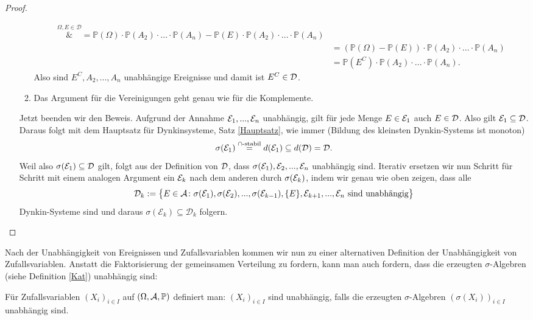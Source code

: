 \begin{proof}
\begin{itemize}
\begin{enumerate}[label=(\roman*)]
\begin{align*}
				\overset{\Omega, E\in \mathcal D}&{=} \mathbb{P}(\Omega) \cdot \mathbb{P}(A_2) \cdot ... \cdot \mathbb{P}(A_n) - \mathbb{P}(E) \cdot \mathbb{P}(A_2) \cdot ... \cdot \mathbb{P}(A_n)\\
				&= (\mathbb{P}(\Omega) - \mathbb{P}(E)) \cdot \mathbb{P}(A_2) \cdot ... \cdot \mathbb{P}(A_n)\\
				&= \mathbb{P}(E^C) \cdot \mathbb{P}(A_2) \cdot ... \cdot \mathbb{P}(A_n).
			\end{align*}
			Also sind $E^C, A_2, ...,A_n$ unabh\"angige Ereignisse und damit ist $E^C\in \mathcal{D}$.
			\item Das Argument f\"ur die Vereinigungen geht genau wie f\"ur die Komplemente.
		\end{enumerate}
		Jetzt beenden wir den Beweis. Aufgrund der Annahme $\mathcal{E}_1,...,\mathcal{E}_n$ unabhängig, gilt f\"ur jede Menge $E\in \mathcal{E}_1$ auch $E\in \mathcal{D}$. Also gilt $\mathcal{E}_1\subseteq \mathcal{D}$. Daraus folgt mit dem Hauptsatz f\"ur Dynkinsysteme, Satz \ref{Hauptsatz}, wie immer (Bildung des kleinsten Dynkin-Systems ist monoton)
			\[ \sigma(\mathcal{E}_1)\overset{\cap\text{-stabil}}{=}  d(\mathcal{E}_1)\subseteq d(\mathcal{D}) = \mathcal{D}. \]			
			Weil also $\sigma(\mathcal{E}_1)\subseteq \mathcal{D}$ gilt, folgt aus der Definition von $\mathcal{D}$, dass $\sigma(\mathcal{E}_1), \mathcal{E}_2,...,\mathcal{E}_n$ unabhängig sind. Iterativ ersetzen wir nun Schritt f\"ur Schritt mit einem analogen Argument ein $\mathcal{E}_k$ nach dem anderen durch $\sigma(\mathcal{E}_k)$, indem wir genau wie oben zeigen, dass alle 
			\begin{align*}
				\mathcal{D}_k:= \big\{ E \in \mathcal{A} \colon \sigma(\mathcal{E}_1), \sigma(\mathcal{E}_2),... ,\sigma(\mathcal{E}_{k-1}),\{E\}, \mathcal{E}_{k+1}, ..., \mathcal{E}_n \text{ sind unabhängig} \big\}
			\end{align*}
			Dynkin-Systeme sind und daraus $\sigma(\mathcal E_k)\subseteq \mathcal D_k$ folgern.
		\end{itemize}
\end{proof}
\marginpar{\textcolor{red}{Vorlesung 24}}
Nach der Unabh\"angigkeit von Ereignissen und Zufallsvariablen kommen wir nun zu einer alternativen Definition der Unabh\"angigkeit von Zufallsvariablen. Anstatt die Faktorisierung der gemeinsamen Verteilung zu fordern, kann man auch fordern, dass die erzeugten $\sigma$-Algebren (siehe Definition \ref{Kat}) unabh\"angig sind:
\begin{deff}\label{unab}
	Für Zufallsvariablen $(X_i)_{i \in I}$ auf $(\Omega, \mathcal{A}, \mathbb{P})$ definiert man: $(X_i)_{i \in I}$ sind unabhängig, falls die erzeugten $\sigma$-Algebren $(\sigma(X_i))_{i \in I}$ unabhängig sind. 
\end{deff}
